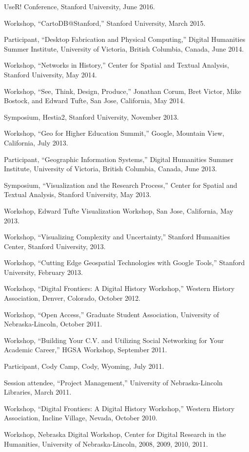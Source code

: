 UseR! Conference, Stanford University, June 2016.

Workshop, ``CartoDB@Stanford,'' Stanford University, March 2015.

Participant, ``Desktop Fabrication and Physical Computing,'' Digital
Humanities Summer Institute, University of Victoria, British Columbia,
Canada, June 2014.

Workshop, ``Networks in History,'' Center for Spatial and Textual
Analysis, Stanford University, May 2014.

Workshop, ``See, Think, Design, Produce,'' Jonathan Corum, Bret Victor,
Mike Bostock, and Edward Tufte, San Jose, California, May 2014.

Symposium, Hestia2, Stanford University, November 2013.

Workshop, ``Geo for Higher Education Summit,'' Google, Mountain View,
California, July 2013.

Participant, ``Geographic Information Systems,'' Digital Humanities
Summer Institute, University of Victoria, British Columbia, Canada, June
2013.

Symposium, ``Visualization and the Research Process,'' Center for
Spatial and Textual Analysis, Stanford University, May 2013.

Workshop, Edward Tufte Visualization Workshop, San Jose, California, May
2013.

Workshop, ``Visualizing Complexity and Uncertainty,'' Stanford
Humanities Center, Stanford University, 2013.

Workshop, ``Cutting Edge Geospatial Technologies with Google Tools,''
Stanford University, February 2013.

Workshop, ``Digital Frontiers: A Digital History Workshop,'' Western
History Association, Denver, Colorado, October 2012.

Workshop, ``Open Access,'' Graduate Student Association, University of
Nebraska-Lincoln, October 2011.

Workshop, ``Building Your C.V. and Utilizing Social Networking for Your
Academic Career,'' HGSA Workshop, September 2011.

Participant, Cody Camp, Cody, Wyoming, July 2011.

Session attendee, ``Project Management,'' University of Nebraska-Lincoln
Libraries, March 2011.

Workshop, ``Digital Frontiers: A Digital History Workshop,'' Western
History Association, Incline Village, Nevada, October 2010.

Workshop, Nebraska Digital Workshop, Center for Digital Research in the
Humanities, University of Nebraska-Lincoln, 2008, 2009, 2010, 2011.

